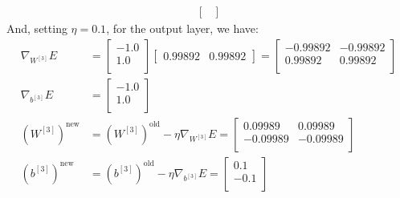 \documentclass{exam}
\begin{document}
\begin{questions}
\begin{itemize}
\begin{equation*}
\begin{split}
\begin{bmatrix}
                    \end{bmatrix}
                \end{split}
            \end{equation*}
            And, setting $\eta = 0.1$, for the output layer, we have:
            \begin{align*}
                \nabla_{W^{[3]}} E &= 
                \begin{bmatrix}
                    -1.0  \\
                    1.0  \\
                \end{bmatrix}
                \begin{bmatrix}
                    0.99892  & 
                    0.99892  
                \end{bmatrix} = 
                \begin{bmatrix}
                    -0.99892 & -0.99892  \\
                    0.99892 & 0.99892  \\
                \end{bmatrix} \\
                \nabla_{b^{[3]}} E &= 
                \begin{bmatrix}
                    -1.0  \\
                    1.0  \\
                \end{bmatrix} \\
                (W^{[3]})^{\text{new}} &= (W^{[3]})^{\text{old}} - \eta \nabla_{W^{[3]}} E = 
                \begin{bmatrix}
                    0.09989 & 0.09989  \\
                    -0.09989 & -0.09989  \\
                \end{bmatrix} \\
                (b^{[3]})^{\text{new}} &= (b^{[3]})^{\text{old}} - \eta \nabla_{b^{[3]}} E = 
                \begin{bmatrix}
                    0.1  \\
                    -0.1  \\
                \end{bmatrix}
            \end{align*}
        \end{itemize}
        \item {\quad }\\[-2em] 

\end{questions}
\end{document}
